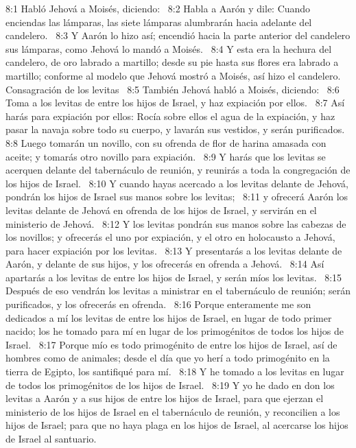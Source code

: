 8:1 Habló Jehová a Moisés, diciendo:  
8:2 Habla a Aarón y dile: Cuando enciendas las lámparas, las siete lámparas alumbrarán hacia adelante del candelero.  
8:3 Y Aarón lo hizo así; encendió hacia la parte anterior del candelero sus lámparas, como Jehová lo mandó a Moisés.  
8:4 Y esta era la hechura del candelero, de oro labrado a martillo; desde su pie hasta sus flores era labrado a martillo; conforme al modelo que Jehová mostró a Moisés, así hizo el candelero.  
Consagración de los levitas  
8:5 También Jehová habló a Moisés, diciendo:  
8:6 Toma a los levitas de entre los hijos de Israel, y haz expiación por ellos.  
8:7 Así harás para expiación por ellos: Rocía sobre ellos el agua de la expiación, y haz pasar la navaja sobre todo su cuerpo, y lavarán sus vestidos, y serán purificados.  
8:8 Luego tomarán un novillo, con su ofrenda de flor de harina amasada con aceite; y tomarás otro novillo para expiación.  
8:9 Y harás que los levitas se acerquen delante del tabernáculo de reunión, y reunirás a toda la congregación de los hijos de Israel.  
8:10 Y cuando hayas acercado a los levitas delante de Jehová, pondrán los hijos de Israel sus manos sobre los levitas;  
8:11 y ofrecerá Aarón los levitas delante de Jehová en ofrenda de los hijos de Israel, y servirán en el ministerio de Jehová.  
8:12 Y los levitas pondrán sus manos sobre las cabezas de los novillos; y ofrecerás el uno por expiación, y el otro en holocausto a Jehová, para hacer expiación por los levitas.  
8:13 Y presentarás a los levitas delante de Aarón, y delante de sus hijos, y los ofrecerás en ofrenda a Jehová.  
8:14 Así apartarás a los levitas de entre los hijos de Israel, y serán míos los levitas.  
8:15 Después de eso vendrán los levitas a ministrar en el tabernáculo de reunión; serán purificados, y los ofrecerás en ofrenda.  
8:16 Porque enteramente me son dedicados a mí los levitas de entre los hijos de Israel, en lugar de todo primer nacido; los he tomado para mí en lugar de los primogénitos de todos los hijos de Israel.  
8:17 Porque mío es todo primogénito de entre los hijos de Israel, así de hombres como de animales; desde el día que yo herí a todo primogénito en la tierra de Egipto, los santifiqué para mí.  
8:18 Y he tomado a los levitas en lugar de todos los primogénitos de los hijos de Israel.  
8:19 Y yo he dado en don los levitas a Aarón y a sus hijos de entre los hijos de Israel, para que ejerzan el ministerio de los hijos de Israel en el tabernáculo de reunión, y reconcilien a los hijos de Israel; para que no haya plaga en los hijos de Israel, al acercarse los hijos de Israel al santuario.  

